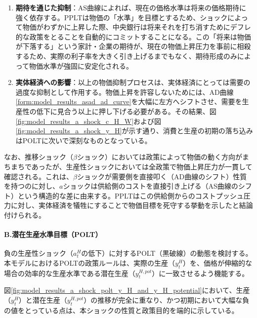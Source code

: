 \begin{enumerate}
    \item\label{itm:model_results_a_shock_asad_analysis_pplt_expectation} \textbf{期待を通じた抑制}：AS曲線によれば、現在の価格水準は将来の価格期待に強く依存する。PPLTは物価の「水準」を目標とするため、ショックによって物価がわずかに上昇した際、中央銀行は将来それを打ち消すためにデフレ的な政策をとることを自動的にコミットすることになる。この「将来は物価が下落する」という家計・企業の期待が、現在の物価上昇圧力を事前に相殺するため、実際の利子率を大きく引き上げるまでもなく、期待形成のみによって物価水準が強固に安定化される。
    \item\label{itm:model_results_a_shock_asad_analysis_pplt_real_economy} \textbf{実体経済への影響}：以上の物価抑制プロセスは、実体経済にとっては需要の過度な抑制として作用する。物価上昇を許容しないためには、AD曲線\eqref{form:model_results_asad_ad_curve}を大幅に左方へシフトさせ、需要を生産性の低下に見合う以上に押し下げる必要がある。その結果、図\ref{fig:model_results_a_shock_c_H_W}および図\ref{fig:model_results_a_shock_y_H}が示す通り、消費と生産の初期の落ち込みはPOLTに次いで深刻なものとなっている。
\end{enumerate}

なお、推移ショック（\(\beta\)ショック）においては政策によって物価の動く方向がまちまちであったが、生産性ショックにおいては全政策で物価上昇圧力が一貫して確認される。これは、\(\beta\)ショックが需要側を直接叩く（AD曲線のシフト）性質を持つのに対し、\(a\)ショックは供給側のコストを直接引き上げる（AS曲線のシフト）という構造的な差に由来する。PPLTはこの供給側からのコストプッシュ圧力に対し、実体経済を犠牲にすることで物価目標を死守する挙動を示したと結論付けられる。

\paragraph{B.潜在生産水準目標（POLT）}\label{sec:model_results_a_shock_asad_analysis_polt}
負の生産性ショック（\(a_t^H\)の低下）に対するPOLT（黒破線）の動態を検討する。本モデルにおけるPOLTの政策ルールは、実際の生産（\(y_t^H\)）を、価格が伸縮的な場合の効率的な生産水準である潜在生産（\(y_t^{H,pot}\)）に一致させるよう機能する。

図\ref{fig:model_results_a_shock_polt_y_H_and_y_H_potential}において、生産（\(y_t^H\)）と潜在生産（\(y_t^{H,pot}\)）の推移が完全に重なり、かつ初期において大幅な負の値をとっている点は、本ショックの性質と政策目的を端的に示している。

